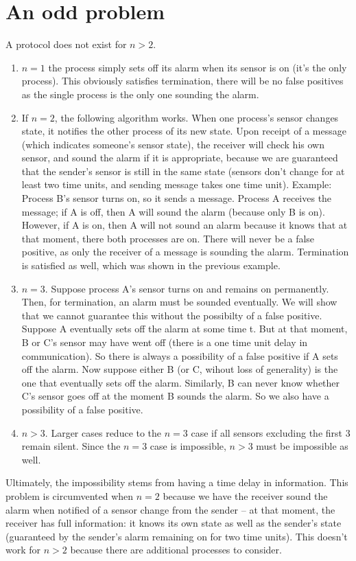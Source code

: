\documentclass{article}
\begin{document}
\section{An odd problem}
A protocol does not exist for $n > 2$.
\begin{enumerate}
\item $n=1$ the process simply sets off its alarm when its sensor is on (it's the only process). This obviously satisfies termination, there will be no false positives as the single process is the only one sounding the alarm.
\item If $n=2$, the following algorithm works. When one process's sensor changes state, it notifies the other process of its new state. Upon receipt of a message (which indicates someone's sensor state), the receiver will check his own sensor, and sound the alarm if it is appropriate, because we are guaranteed that the sender's sensor is still in the same state (sensors don't change for at least two time units, and sending message takes one time unit). Example: Process B's sensor turns on, so it sends a message. Process A receives the message; if A is off, then A will sound the alarm (because only B is on). However, if A is on, then A will not sound an alarm because it knows that at that moment, there both processes are on. There will never be a false positive, as only the receiver of a message is sounding the alarm. Termination is satisfied as well, which was shown in the previous example. 
\item $n=3$. Suppose process A's sensor turns on and remains on permanently. Then, for termination, an alarm must be sounded eventually. We will show that we cannot guarantee this without the possibilty of a false positive. Suppose A eventually sets off the alarm at some time t. But at that moment, B or C's sensor may have went off (there is a one time unit delay in communication). So there is always a possibility of a false positive if A sets off the alarm. Now suppose either B (or C, wihout loss of generality) is the one that eventually sets off the alarm. Similarly, B can never know whether C's sensor goes off at the moment B sounds the alarm. So we also have a possibility of a false positive.
\item $n>3$. Larger cases reduce to the $n=3$ case if all sensors excluding the first 3 remain silent. Since the $n=3$ case is impossible, $n>3$ must be impossible as well.
\end{enumerate}
Ultimately, the impossibility stems from having a time delay in information. This problem is circumvented when $n=2$ because we have the receiver sound the alarm when notified of a sensor change from the sender -- at that moment, the receiver has full information: it knows its own state as well as the sender's state (guaranteed by the sender's alarm remaining on for two time units). This doesn't work for $n>2$ because there are additional processes to consider.

\end{document}
